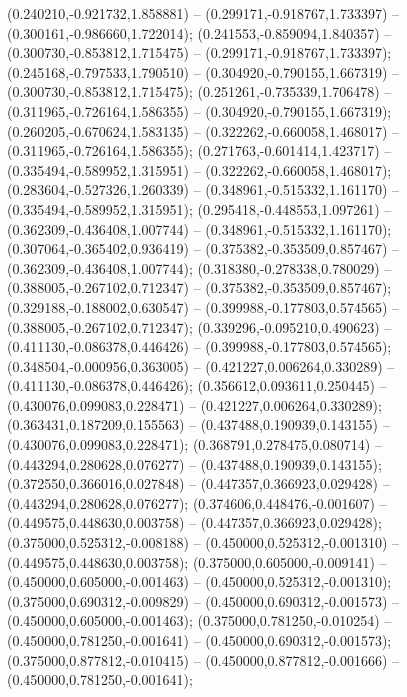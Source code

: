  (0.240210,-0.921732,1.858881) -- (0.299171,-0.918767,1.733397) -- (0.300161,-0.986660,1.722014);
 (0.241553,-0.859094,1.840357) -- (0.300730,-0.853812,1.715475) -- (0.299171,-0.918767,1.733397);
 (0.245168,-0.797533,1.790510) -- (0.304920,-0.790155,1.667319) -- (0.300730,-0.853812,1.715475);
 (0.251261,-0.735339,1.706478) -- (0.311965,-0.726164,1.586355) -- (0.304920,-0.790155,1.667319);
 (0.260205,-0.670624,1.583135) -- (0.322262,-0.660058,1.468017) -- (0.311965,-0.726164,1.586355);
 (0.271763,-0.601414,1.423717) -- (0.335494,-0.589952,1.315951) -- (0.322262,-0.660058,1.468017);
 (0.283604,-0.527326,1.260339) -- (0.348961,-0.515332,1.161170) -- (0.335494,-0.589952,1.315951);
 (0.295418,-0.448553,1.097261) -- (0.362309,-0.436408,1.007744) -- (0.348961,-0.515332,1.161170);
 (0.307064,-0.365402,0.936419) -- (0.375382,-0.353509,0.857467) -- (0.362309,-0.436408,1.007744);
 (0.318380,-0.278338,0.780029) -- (0.388005,-0.267102,0.712347) -- (0.375382,-0.353509,0.857467);
 (0.329188,-0.188002,0.630547) -- (0.399988,-0.177803,0.574565) -- (0.388005,-0.267102,0.712347);
 (0.339296,-0.095210,0.490623) -- (0.411130,-0.086378,0.446426) -- (0.399988,-0.177803,0.574565);
 (0.348504,-0.000956,0.363005) -- (0.421227,0.006264,0.330289) -- (0.411130,-0.086378,0.446426);
 (0.356612,0.093611,0.250445) -- (0.430076,0.099083,0.228471) -- (0.421227,0.006264,0.330289);
 (0.363431,0.187209,0.155563) -- (0.437488,0.190939,0.143155) -- (0.430076,0.099083,0.228471);
 (0.368791,0.278475,0.080714) -- (0.443294,0.280628,0.076277) -- (0.437488,0.190939,0.143155);
 (0.372550,0.366016,0.027848) -- (0.447357,0.366923,0.029428) -- (0.443294,0.280628,0.076277);
 (0.374606,0.448476,-0.001607) -- (0.449575,0.448630,0.003758) -- (0.447357,0.366923,0.029428);
 (0.375000,0.525312,-0.008188) -- (0.450000,0.525312,-0.001310) -- (0.449575,0.448630,0.003758);
 (0.375000,0.605000,-0.009141) -- (0.450000,0.605000,-0.001463) -- (0.450000,0.525312,-0.001310);
 (0.375000,0.690312,-0.009829) -- (0.450000,0.690312,-0.001573) -- (0.450000,0.605000,-0.001463);
 (0.375000,0.781250,-0.010254) -- (0.450000,0.781250,-0.001641) -- (0.450000,0.690312,-0.001573);
 (0.375000,0.877812,-0.010415) -- (0.450000,0.877812,-0.001666) -- (0.450000,0.781250,-0.001641);
